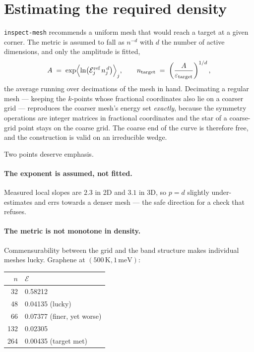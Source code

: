 \documentclass[11pt,a4paper]{article}
\newcommand{\code}[1]{\texttt{#1}}
\begin{document}
\section{Estimating the required density}
\label{sec:density}

\code{inspect-mesh} recommends a uniform mesh that would reach a target at a
given corner. The metric is assumed to fall as $n^{-d}$ with $d$ the number of
active dimensions, and only the amplitude is fitted,
\begin{equation}
  A \;=\; \exp\Bigl\langle \ln\bigl(\mathcal{E}^{\text{ref}}_j\, n_j^{\,d}\bigr) \Bigr\rangle_j ,
  \qquad
  n_\text{target} \;=\; \left(\frac{A}{\varepsilon_\text{target}}\right)^{1/d} ,
\end{equation}
the average running over decimations of the mesh in hand. Decimating a regular
mesh --- keeping the $k$-points whose fractional coordinates also lie on a
coarser grid --- reproduces the coarser mesh's energy set \emph{exactly},
because the symmetry operations are integer matrices in fractional coordinates
and the star of a coarse-grid point stays on the coarse grid. The coarse end of
the curve is therefore free, and the construction is valid on an irreducible
wedge.

Two points deserve emphasis.

\paragraph{The exponent is assumed, not fitted.} Measured local slopes are
$2.3$ in 2D and $3.1$ in 3D, so $p = d$ slightly under-estimates and errs
towards a denser mesh --- the safe direction for a check that refuses.

\paragraph{The metric is not monotone in density.} Commensurability between the
grid and the band structure makes individual meshes lucky. Graphene at
$(500\,\mathrm{K}, 1\,\mathrm{meV})$:

\begin{center}
\begin{tabular}{rl}
\toprule
$n$ & $\mathcal{E}$ \\
\midrule
 32 & 0.58212 \\
 48 & 0.04135 \quad (lucky) \\
 66 & 0.07377 \quad (finer, yet worse) \\
132 & 0.02305 \\
264 & 0.00435 \quad (target met) \\
\bottomrule
\end{tabular}
\end{center}
\end{document}
